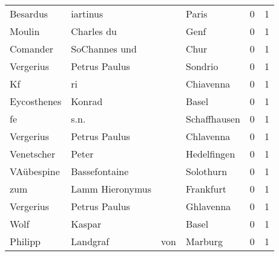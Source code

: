 \documentclass[10pt,a4paper,landscape]{article}
\begin{document}
\begin{longtable}{llllrr}
                 Besardus &                           iartinus &             &                                       Paris &          0 &         1 \\
                   Moulin &                         Charles du &             &                                        Genf &          0 &         1 \\
                 Comander &                      SoChannes und &             &                                        Chur &          0 &         1 \\
                Vergerius &                      Petrus Paulus &             &                                     Sondrio &          0 &         1 \\
                       Kf &                                 ri &             &                                   Chiavenna &          0 &         1 \\
              Eycosthenes &                             Konrad &             &                                       Basel &          0 &         1 \\
                       fe &                               s.n. &             &                                Schaffhausen &          0 &         1 \\
                Vergerius &                      Petrus Paulus &             &                                   Chlavenna &          0 &         1 \\
               Venetscher &                              Peter &             &                                 Hedelfingen &          0 &         1 \\
               VAübespine &                      Bassefontaine &             &                                   Solothurn &          0 &         1 \\
                      zum &                    Lamm Hieronymus &             &                                   Frankfurt &          0 &         1 \\
                Vergerius &                      Petrus Paulus &             &                                   Ghlavenna &          0 &         1 \\
                     Wolf &                             Kaspar &             &                                       Basel &          0 &         1 \\
                  Philipp &                           Landgraf &         von &                                     Marburg &          0 &         1 \\

\end{longtable}
\end{document}
